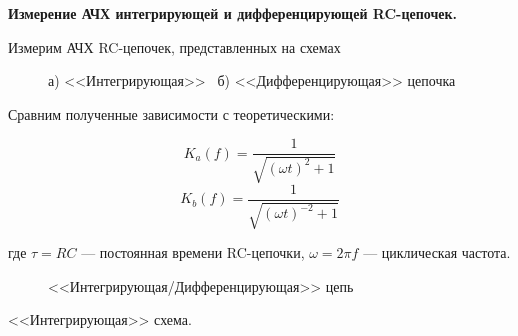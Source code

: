 \documentclass[14pt]{article}
\begin{document}
\newpage
\vspace{0.5cm}
\textbf{Измерение АЧХ интегрирующей и дифференцирующей RC-цепочек.}

Измерим АЧХ RC-цепочек, представленных на схемах

\begin{figure}[h!]
	\caption{а) <<Интегрирующая>> ~б) <<Дифференцирующая>> цепочка}
	\label{fig:image}
\end{figure}

Сравним полученные зависимости с теоретическими:

$$K_a(f) = \frac{1}{\sqrt{(\omega t)^2 + 1}}$$
$$K_b(f) = \frac{1}{\sqrt{(\omega t)^{-2} + 1}}$$

\noindent где $\tau = RC$ --- постоянная времени RC-цепочки, $\omega = 2\pi f$ — циклическая
частота.

\begin{figure}[h!]
	\caption{<<Интегрирующая/Дифференцирующая>> цепь}
	\label{fig:image}
\end{figure}

<<Интегрирующая>> схема.
\end{document}
